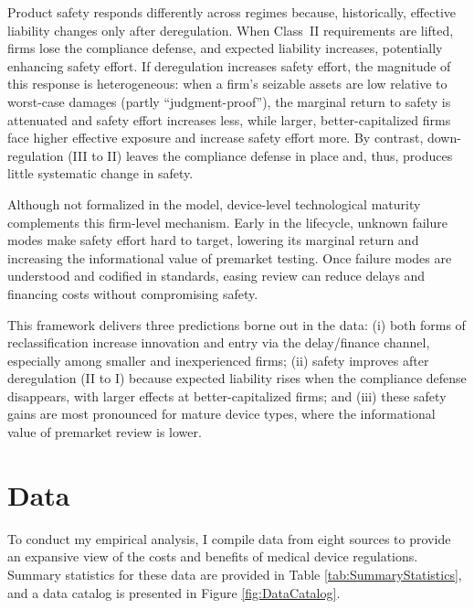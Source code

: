 \documentclass[letterpaper,12pt]{article}
\theoremstyle{definition}
\begin{document}
Product safety responds differently across regimes because, historically, effective liability changes only after deregulation. When Class~II requirements are lifted, firms lose the compliance defense, and expected liability increases, potentially enhancing safety effort. If deregulation increases safety effort, the magnitude of this response is heterogeneous: when a firm’s seizable assets are low relative to worst-case damages (partly “judgment-proof”), the marginal return to safety is attenuated and safety effort increases less, while larger, better-capitalized firms face higher effective exposure and increase safety effort more. By contrast, down-regulation (III to II) leaves the compliance defense in place and, thus, produces little systematic change in safety.



Although not formalized in the model, device-level technological maturity complements this firm-level mechanism. Early in the lifecycle, unknown failure modes make safety effort hard to target, lowering its marginal return and increasing the informational value of premarket testing. Once failure modes are understood and codified in standards, easing review can reduce delays and financing costs without compromising safety.



This framework delivers three predictions borne out in the data: (i) both forms of reclassification increase innovation and entry via the delay/finance channel, especially among smaller and inexperienced firms; (ii) safety improves after deregulation (II to I) because expected liability rises when the compliance defense disappears, with larger effects at better-capitalized firms; and (iii) these safety gains are most pronounced for mature device types, where the informational value of premarket review is lower.

\section{Data}\label{sec:Data}

To conduct my empirical analysis, I compile data from eight sources to provide an expansive view of the costs and benefits of medical device regulations. Summary statistics for these data are provided in Table \ref{tab:SummaryStatistics}, and a data catalog is presented in Figure \ref{fig:DataCatalog}.
\end{document}
